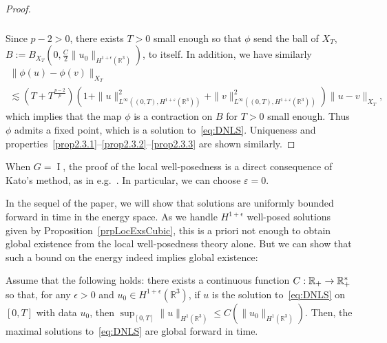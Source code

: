 \documentclass[AHL,Unicode,longabstracts,published]{cedram}
\newcommand*\R{\mathbb{R}}
\newcommand*\eps{\varepsilon}
\DeclareMathOperator{\I}{I}
\renewcommand*{\to}{\mathchoice{\longrightarrow}{\rightarrow}{\rightarrow}{\rightarrow}}
\begin{document}
\begin{proof}
\begin{multline*}
\begin{aligned}
\end{aligned}
\end{multline*}
Since $p - 2 >0$, there exists $T>0$ small enough so that $\phi$ send the ball of $X_T$, $B:= B_{X_T}(0, \frac C2 \| u_0 \|_{H^{1+\epsilon}(\R ^3)})$, to itself. In addition, we have similarly
\begin{multline*}
\| \phi(u) - \phi(v) \|_{X_T}\\
\lesssim \left(T + T^{\frac{p - 2}{p}}\right) \left(1+\| u \|_{L^\infty\left((0,T),H^{1 + \eps}(\R^3)\right) }^{2}+ \| v \|_{L^\infty\left((0,T),H^{1 +\eps}(\R^3)\right) }^2\right)\| u -v \|_{X_T},
\end{multline*}
which implies that the map $\phi$ is a contraction on $B$ for $T>0$ small enough. Thus $\phi$ admits a fixed point, which is a solution to~\eqref{eq:DNLS}. Uniqueness and properties~\eqref{prop2.3.1}--\eqref{prop2.3.2}--\eqref{prop2.3.3} are shown similarly.
\end{proof}

\begin{rema}
When $G = \I$, the proof of the local well-posedness is a direct consequence of Kato's method, as in e.g.~\cite[Section~$4.4$]{Ca03}. In particular, we can choose $\eps = 0$.
\end{rema}

In the sequel of the paper, we will show that solutions are uniformly bounded forward in time in the energy space. As we handle $H^{1+\epsilon}$ well-posed solutions given by Proposition~\ref{prpLocExsCubic}, this is a priori not enough to obtain global existence from the local well-posedness theory alone. But we can show that such a bound on the energy indeed implies global existence:

\begin{prop}\label{prop:cond_glob}
Assume that the following holds: there exists a continuous function $C: \R_+ \to \R_+^*$ so that, for any $\epsilon >0$ and $u_0 \in H^{1+\epsilon}(\R^3)$, if $u$ is the solution to~\eqref{eq:DNLS} on $[0, T]$ with data $u_0$, then $\sup_{[0, T]}\| u \|_{H^1(\R^3)} \leq C(\| u_0 \|_{H^1(\R^3)})$. Then, the maximal solutions to~\eqref{eq:DNLS} are global forward in time.
\end{prop}
\end{document}
